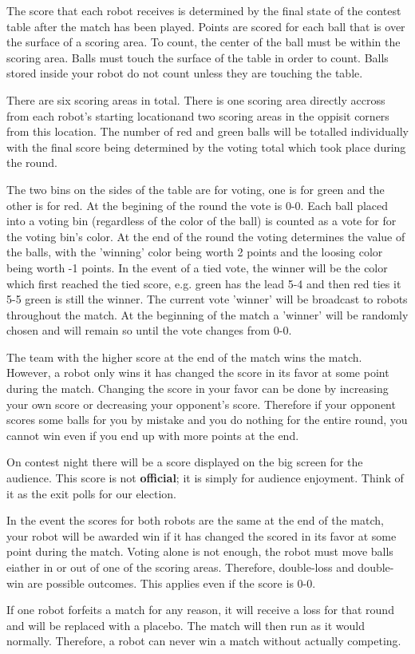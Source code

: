 
The score that each robot receives is determined by the final state of
the contest table after the match has been played.  Points are scored
for each ball that is over the surface of a scoring area. To count,
the center of the ball must be within the scoring area. Balls must
touch the surface of the table in order to count. Balls stored inside
your robot do not count unless they are touching the table.

There are six scoring areas in total. There is one scoring area directly accross from each robot's starting locationand two scoring areas in the oppisit corners from this location. The number of red and green balls will be totalled individually with the final score being determined by the voting total which took place during the round.

The two bins on the sides of the table are for voting, one is for green and the other is for red. At the begining of the round the vote is 0-0. Each ball placed into a voting bin (regardless of the color of the ball) is counted as a vote for for the voting bin's color. At the end of the round the voting determines the value of the balls, with the 'winning' color being worth 2 points and the loosing color being worth -1 points. In the event of a tied vote, the winner will be the color which first reached the tied score, e.g. green has the lead 5-4 and then red ties it 5-5 green is still the winner. The current vote 'winner' will be broadcast to robots throughout the match. At the beginning of the match a 'winner' will be randomly chosen and will remain so until the vote changes from 0-0. 

The team with the higher score at the end of the match wins the
match. However, a robot only wins it has
changed the score in its favor at some point during the
match. Changing the score in your favor can be done by increasing your
own score or decreasing your opponent's score. Therefore if your
opponent scores some balls for you by mistake and you do nothing for
the entire round, you cannot win even if you end up with more points
at the end.

On contest night there will be a score displayed on the big screen for the audience. This score is not {\bf official}; it is simply for audience enjoyment.
 Think of it as the exit polls for our election.

In the event the scores for both robots are the same at the end of the
match, your robot will be awarded win if it has changed the scored in
its favor at some point during the match. Voting alone is not enough, the robot must move balls eiather in or out of one of the scoring areas. Therefore, double-loss and double-win are possible outcomes. This applies even if the score is
0-0.

If one robot forfeits a match for any reason, it will receive a loss
for that round and will be replaced with a placebo. The match will
then run as it would normally. Therefore, a robot can never win a
match without actually competing.
